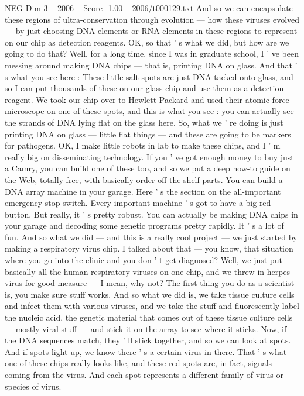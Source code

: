 \begin{textsample}{NEG Dim 3 – 2006 – Score -1.00 – 2006/t000129.txt}
And so we can encapsulate these regions of ultra-conservation through evolution — how these viruses evolved — by just choosing DNA elements or RNA elements in these regions to represent on our chip as detection reagents.
OK, so that ' s what we did, but how are we going to do that?
Well, for a long time, since I was in graduate school, I ' ve been messing around making DNA chips — that is, printing DNA on glass.
And that ' s what you see here : These little salt spots are just DNA tacked onto glass, and so I can put thousands of these on our glass chip and use them as a detection reagent.
We took our chip over to Hewlett-Packard and used their atomic force microscope on one of these spots, and this is what you see : you can actually see the strands of DNA lying flat on the glass here.
So, what we ' re doing is just printing DNA on glass — little flat things — and these are going to be markers for pathogens.
OK, I make little robots in lab to make these chips, and I ' m really big on disseminating technology.
If you ' ve got enough money to buy just a Camry, you can build one of these too, and so we put a deep how-to guide on the Web, totally free, with basically order-off-the-shelf parts.
You can build a DNA array machine in your garage.
Here ' s the section on the all-important emergency stop switch.
Every important machine ' s got to have a big red button.
But really, it ' s pretty robust.
You can actually be making DNA chips in your garage and decoding some genetic programs pretty rapidly.
It ' s a lot of fun.
And so what we did — and this is a really cool project — we just started by making a respiratory virus chip.
I talked about that — you know, that situation where you go into the clinic and you don ' t get diagnosed?
Well, we just put basically all the human respiratory viruses on one chip, and we threw in herpes virus for good measure — I mean, why not?
The first thing you do as a scientist is, you make sure stuff works.
And so what we did is, we take tissue culture cells and infect them with various viruses, and we take the stuff and fluorescently label the nucleic acid, the genetic material that comes out of these tissue culture cells — mostly viral stuff — and stick it on the array to see where it sticks.
Now, if the DNA sequences match, they ' ll stick together, and so we can look at spots.
And if spots light up, we know there ' s a certain virus in there.
That ' s what one of these chips really looks like, and these red spots are, in fact, signals coming from the virus.
And each spot represents a different family of virus or species of virus.

\end{textsample}
